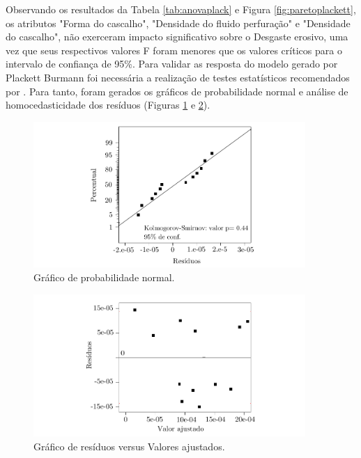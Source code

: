 Observando os resultados da Tabela \ref{tab:anovaplack} e Figura \ref{fig:paretoplackett}, os atributos "Forma do cascalho", "Densidade do fluido perfuração" e "Densidade do cascalho", não exerceram impacto significativo sobre o Desgaste erosivo, uma vez que seus respectivos valores F foram menores que os valores críticos para o intervalo de confiança de 95\%. Para validar as resposta do modelo gerado por Plackett Burmann foi necessária a realização de testes estatísticos recomendados por . Para tanto, foram gerados os gráficos de probabilidade normal e análise de homocedasticidade dos resíduos (Figuras \ref{fig:probnormalplackett} e \ref{fig:residuosplackett}).

\begin{figure}[H] 
    \centering  
    \includegraphics[width=0.92\textwidth]{Figuras/probnormalplacket.pdf}  
    \caption{Gráfico de probabilidade normal.}  
    \label{fig:probnormalplackett}  
\end{figure}


\begin{figure}[H] 
    \centering  
    \includegraphics[width=0.92\textwidth]{Figuras/residuosPLACKETT.pdf}  
    \caption{Gráfico de resíduos versus Valores ajustados.}  
    \label{fig:residuosplackett}  
\end{figure}

